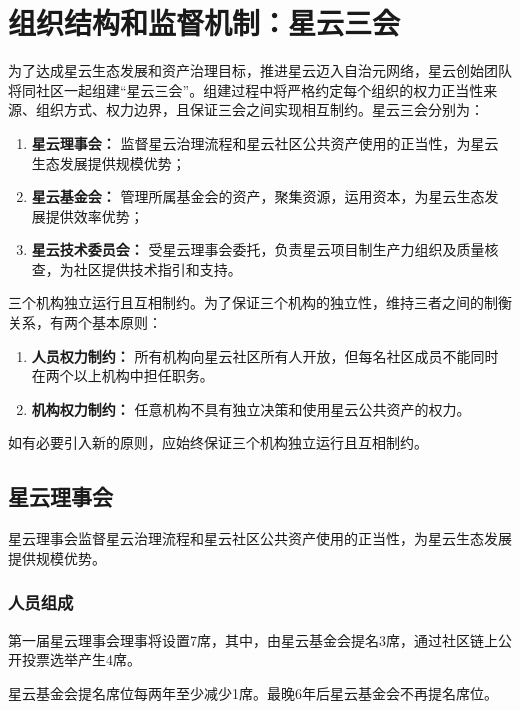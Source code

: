\section{组织结构和监督机制：星云三会}

为了达成星云生态发展和资产治理目标，推进星云迈入自治元网络，星云创始团队将同社区一起组建“星云三会”。组建过程中将严格约定每个组织的权力正当性来源、组织方式、权力边界，且保证三会之间实现相互制约。星云三会分别为：

\begin{enumerate}
	\item \textbf{星云理事会：} 监督星云治理流程和星云社区公共资产使用的正当性，为星云生态发展提供规模优势；
	\item \textbf{星云基金会：} 管理所属基金会的资产，聚集资源，运用资本，为星云生态发展提供效率优势；
	\item \textbf{星云技术委员会：} 受星云理事会委托，负责星云项目制生产力组织及质量核查，为社区提供技术指引和支持。
\end{enumerate}

\vspace{2em}

三个机构独立运行且互相制约。为了保证三个机构的独立性，维持三者之间的制衡关系，有两个基本原则：

\begin{enumerate}
	\item \textbf{人员权力制约：} 所有机构向星云社区所有人开放，但每名社区成员不能同时在两个以上机构中担任职务。
	\item \textbf{机构权力制约：} 任意机构不具有独立决策和使用星云公共资产的权力。
\end{enumerate}

如有必要引入新的原则，应始终保证三个机构独立运行且互相制约。

\subsection{星云理事会}

星云理事会监督星云治理流程和星云社区公共资产使用的正当性，为星云生态发展提供规模优势。

\subsubsection{人员组成}

第一届星云理事会理事将设置7席，其中，由星云基金会提名3席，通过社区链上公开投票选举产生4席。

星云基金会提名席位每两年至少减少1席。最晚6年后星云基金会不再提名席位。

